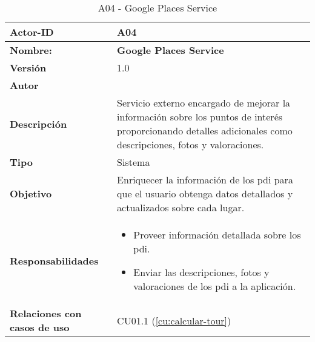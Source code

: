 \begin{table}[H]
	\centering

	\begin{tabularx}{\linewidth}{ p{} p{} }
		\toprule
		\textbf{Actor-ID}    & A04 \\
		\toprule
		\textbf{Nombre: } 			  & \textbf{Google Places Service} \\
		\textbf{Versión}              & 1.0    \\
		\textbf{Autor}                & \autor \\
		\textbf{Descripción}          & Servicio externo encargado de mejorar la información sobre los puntos de interés proporcionando detalles adicionales como descripciones, fotos y valoraciones. \\
		\textbf{Tipo}                 & Sistema \\
		\textbf{Objetivo}             & Enriquecer la información de los \acrlong{pdi} para que el usuario obtenga datos detallados y actualizados sobre cada lugar. \\
		\textbf{Responsabilidades}    & 
		\begin{itemize}
			\tightlist
			\item Proveer información detallada sobre los \acrshort{pdi}.
			\item Enviar las descripciones, fotos y valoraciones de los \acrshort{pdi} a la aplicación.
		\end{itemize}\\
		\textbf{Relaciones con casos de uso} & CU01.1 (\ref{cu:calcular-tour})\\
		\bottomrule
	\end{tabularx}
	\caption{A04 - Google Places Service}
	\label{actor:google-places}
\end{table}

